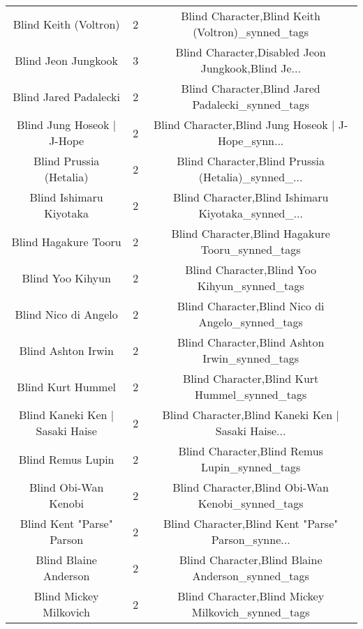\begin{table}[h!]
{\begin{tabular}{|c|c|c|}
                             Blind Keith (Voltron) &          2 &  Blind Character,Blind Keith (Voltron)\_synned\_tags \\
                               Blind Jeon Jungkook &          3 & Blind Character,Disabled Jeon Jungkook,Blind Je... \\
                             Blind Jared Padalecki &          2 &  Blind Character,Blind Jared Padalecki\_synned\_tags \\
                        Blind Jung Hoseok | J-Hope &          2 & Blind Character,Blind Jung Hoseok | J-Hope\_synn... \\
                           Blind Prussia (Hetalia) &          2 & Blind Character,Blind Prussia (Hetalia)\_synned\_... \\
                           Blind Ishimaru Kiyotaka &          2 & Blind Character,Blind Ishimaru Kiyotaka\_synned\_... \\
                              Blind Hagakure Tooru &          2 &   Blind Character,Blind Hagakure Tooru\_synned\_tags \\
                                  Blind Yoo Kihyun &          2 &       Blind Character,Blind Yoo Kihyun\_synned\_tags \\
                              Blind Nico di Angelo &          2 &   Blind Character,Blind Nico di Angelo\_synned\_tags \\
                                Blind Ashton Irwin &          2 &     Blind Character,Blind Ashton Irwin\_synned\_tags \\
                                 Blind Kurt Hummel &          2 &      Blind Character,Blind Kurt Hummel\_synned\_tags \\
                   Blind Kaneki Ken | Sasaki Haise &          2 & Blind Character,Blind Kaneki Ken | Sasaki Haise... \\
                                 Blind Remus Lupin &          2 &      Blind Character,Blind Remus Lupin\_synned\_tags \\
                              Blind Obi-Wan Kenobi &          2 &   Blind Character,Blind Obi-Wan Kenobi\_synned\_tags \\
                         Blind Kent "Parse" Parson &          2 & Blind Character,Blind Kent "Parse" Parson\_synne... \\
                             Blind Blaine Anderson &          2 &  Blind Character,Blind Blaine Anderson\_synned\_tags \\
                            Blind Mickey Milkovich &          2 & Blind Character,Blind Mickey Milkovich\_synned\_tags \\

\end{tabular}}
\end{table}
